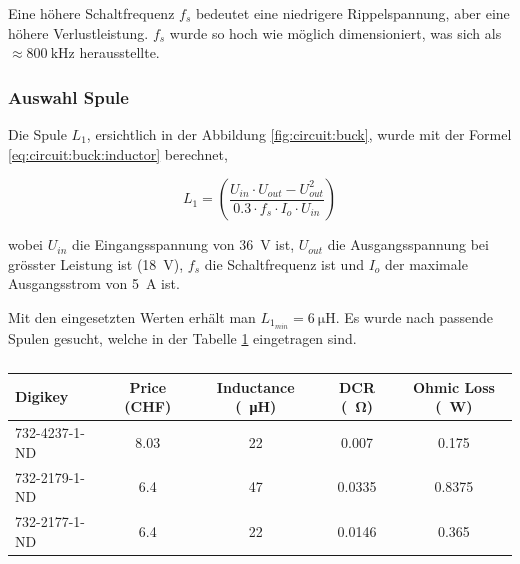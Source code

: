 Eine h\"ohere Schaltfrequenz $f_s$ bedeutet eine niedrigere Rippelspannung, aber
eine h\"ohere Verlustleistung. $f_s$ wurde so hoch wie m\"oglich  dimensioniert,
was sich als $\approx \SI{800}{\kilo\hertz}$ herausstellte.

\subsubsection*{Auswahl Spule}

Die Spule $L_1$, ersichtlich in der Abbildung \ref{fig:circuit:buck}, wurde  mit
der Formel \ref{eq:circuit:buck:inductor} berechnet,

\begin{equation}
    L_1 = \left( \frac{U_{in} \cdot U_{out} - U_{out}^2}{0.3 \cdot f_s \cdot I_o \cdot U_{in}} \right)
    \label{eq:circuit:buck:inductor}
\end{equation}

wobei  $U_{in}$  die  Eingangsspannung von  \SI{36}{\volt}  ist,  $U_{out}$  die
Ausgangsspannung   bei  gr\"osster  Leistung  ist  (\SI{18}{\volt}),  $f_s$  die
Schaltfrequenz ist und $I_o$ der maximale Ausgangsstrom von \SI{5}{\ampere} ist.

Mit den  eingesetzten  Werten erh\"alt man $L_{1_{min}} = \SI{6}{\micro\henry}$.
Es   wurde    nach    passende   Spulen   gesucht,   welche   in   der   Tabelle
\ref{tab:circuit:buck:inductor} eingetragen sind.

\begin{table}[th!]
    \begin{center}
        \caption{}
        \label{tab:circuit:buck:inductor}
        \begin{tabular}{lcccc}
            \toprule
            Digikey         & Price (CHF) & Inductance (\SI{}{\micro\henry}) & DCR (\SI{}{\ohm}) & Ohmic Loss (\SI{}{\watt}) \\
            \midrule
            \rowcolor{lightgray}
            732-4237-1-ND   & 8.03        & 22                               & 0.007             & 0.175  \\
            732-2179-1-ND   & 6.4         & 47                               & 0.0335            & 0.8375 \\
            732-2177-1-ND   & 6.4         & 22                               & 0.0146            & 0.365  \\
            \bottomrule
        \end{tabular}
    \end{center}
\end{table}

